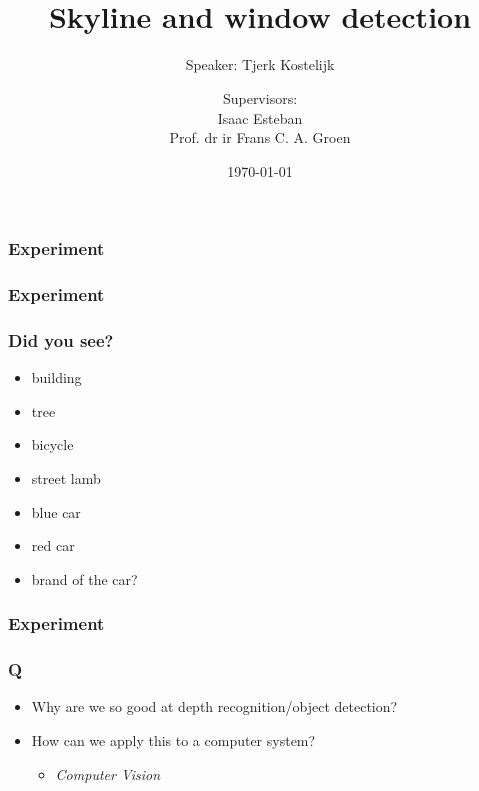 \documentclass{beamer}
\title{\sc{Semantic annotation of urban scenes:}\\Skyline and window detection}
\subtitle{Speaker: Tjerk Kostelijk}
\author{Supervisors: \\Isaac Esteban\\Prof. dr ir Frans C. A. Groen}
\date{\today}
\begin{document}


\frame{\titlepage}





\frame
{
	\frametitle{Experiment}
}


\frame
{
	\frametitle{Experiment}
}


\frame
{
}



\frame
{
	\frametitle{Did you see?}
	\begin{itemize}
		\item <+-| alert@+> building
		\item <+-| alert@+> tree
		\item <+-| alert@+> bicycle
		\item <+-| alert@+> street lamb
		\item <+-| alert@+> blue car
		\item <+-| alert@+> red car
		\item <+-| alert@+> brand of the car?
	\end{itemize}
}

\frame
{
	\frametitle{Experiment}
}


\frame
{
	\frametitle{Q}
	\begin{itemize}
	\item <+-| alert@+> Why are we so good at depth recognition/object detection?
	\item <+-| alert@+> How can we apply this to a computer system?
		\begin{itemize}
			\item <+-| alert@+> {\textit{Computer Vision}}
		\end{itemize}
	\end{itemize}
}
\end{document}
